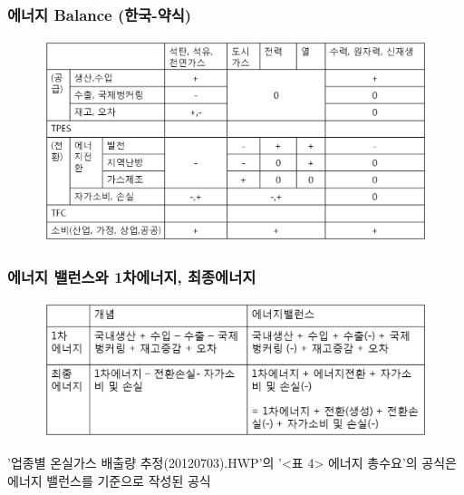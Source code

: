 \documentclass[10pt,compress,slidetop,%
			   hyperref={unicode},xcolor={svgnames},%
			   t]{beamer}
\begin{document}
%
\begin{frame}
	\frametitle{에너지 Balance (한국-약식)}
	  	\begin{figure}
	\centering
	 \includegraphics[width=1.00\textwidth]{EBKS.png}
	\label{IEA world balance}
	\end{figure}	
	
\end{frame}

\begin{frame}
	\frametitle{에너지 밸런스와 1차에너지, 최종에너지}
	  	\begin{figure}
	\centering
	 \includegraphics[width=1.00\textwidth]{Definition.png}
	\label{IEA world balance}
	\end{figure}	
	\bigskip
	'업종별 온실가스 배출량 추정(20120703).HWP'의 '<표 4> 에너지 총수요'의 공식은 에너지 밸런스를 기준으로 작성된 공식
	
\end{frame}
\end{document}
